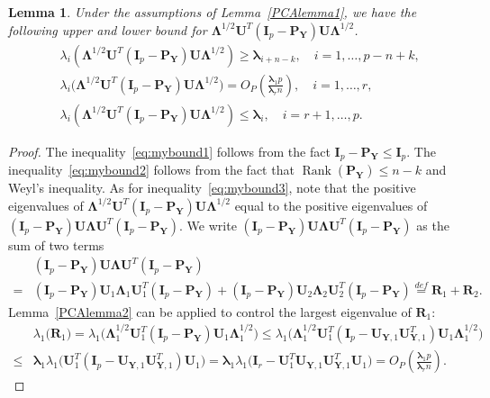 \documentclass[12pt]{article} %
\DeclareMathOperator{\myrank}{Rank}
\newcommand{\bP}{\mathbf{P}}
\newcommand{\bY}{\mathbf{Y}}
\newcommand{\bR}{\mathbf{R}}
\newcommand{\bI}{\mathbf{I}}
\newcommand{\bU}{\mathbf{U}}
\newcommand{\bfsym}[1]{\ensuremath{\boldsymbol{#1}}}
\def\blambda {\bfsym {\lambda}}
\def\bLambda {\bfsym {\Lambda}}
\newtheorem{lemma}{Lemma}
\theoremstyle{definition}
\begin{document}
\begin{appendices}
\begin{lemma}\label{gg:Lemma1}
    Under the assumptions of Lemma~\ref{PCAlemma1},
    we have the following upper and lower bound for $\bLambda^{1/2}\bU^T (\bI_p-\bP_{\bY})\bU\bLambda^{1/2}$.
    \begin{align}
        &\lambda_i (\bLambda^{1/2}\bU^T (\bI_p-\bP_{\bY})\bU\bLambda^{1/2})\geq
        \blambda_{i+n-k},\quad 
        \text{$i=1,\ldots, p-n+k$},
        \label{eq:mybound2}\\
        &\lambda_i\big(\bLambda^{1/2}\bU^T (\bI_p-\bP_{\bY})\bU\bLambda^{1/2}\big)= O_P(\frac{\blambda_1 p}{\blambda_r n}),\quad
        \text{$i=1,\ldots, r$},\label{eq:mybound3}\\
        &\lambda_i (\bLambda^{1/2}\bU^T (\bI_p-\bP_{\bY})\bU\bLambda^{1/2})\leq
        \blambda_i, \quad 
        \text{$i=r+1,\ldots, p$}.\label{eq:mybound1}
    \end{align}
\end{lemma}
\begin{proof}
    The inequality~\eqref{eq:mybound1} follows from the fact $\bI_p-\bP_{\bY}\leq \bI_p$.
    The inequality~\eqref{eq:mybound2} follows from the fact that $\myrank(\bP_{\bY})\leq n-k$ and Weyl's inequality.
    As for inequality~\eqref{eq:mybound3}, note that the positive eigenvalues of $\bLambda^{1/2}\bU^T (\bI_p-\bP_{\bY})\bU\bLambda^{1/2}$  equal to the positive eigenvalues of $(\bI_p-\bP_{\bY})\bU\bLambda \bU^T (\bI_p-\bP_{\bY})$.
We write $(\bI_p-\bP_{\bY})\bU\bLambda \bU^T (\bI_p-\bP_{\bY})$ as the sum of two terms
$$
\begin{aligned}
&(\bI_p-\bP_{\bY})\bU\bLambda \bU^T (\bI_p-\bP_{\bY})
\\
=&
(\bI_p-\bP_{\bY})\bU_1\bLambda_1 \bU_1^T(\bI_p-\bP_{\bY})+(\bI_p-\bP_{\bY})\bU_2\bLambda_2 \bU_2^T (\bI_p-\bP_{\bY})
\overset{def}{=}\bR_1+\bR_2.
\end{aligned}
$$
Lemma~\ref{PCAlemma2} can be applied to control the largest eigenvalue of $\bR_1$:
$$
\begin{aligned}
&\lambda_{1}\big( \bR_1 \big)
=
\lambda_{1}\big(\bLambda_1^{1/2} \bU_1^T(\bI_p-\bP_{\bY}) \bU_1 \bLambda_1^{1/2}\big)
\leq 
\lambda_{1}\big(\bLambda_1^{1/2} \bU_1^T(\bI_p-\bU_{\bY,1}\bU_{\bY,1}^T) \bU_1 \bLambda_1^{1/2}\big)\\
\leq &
\blambda_1
\lambda_{1}\big(\bU_1^T(\bI_p-\bU_{\bY,1}\bU_{\bY,1}^T) \bU_1 \big)
= 
\blambda_1
\lambda_{1}\big(\bI_r - \bU_1^T\bU_{\bY,1}\bU_{\bY,1}^T \bU_1 \big)
=
O_P(\frac{\blambda_1 p}{\blambda_r n}).
\end{aligned}
$$
\end{proof}
\end{appendices}
\end{document}
